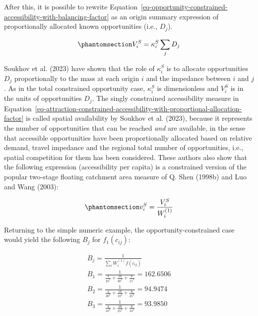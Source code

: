 \documentclass[
]{article}
\begin{document}
After this, it is possible to rewrite
Equation~\ref{eq-opportunity-constrained-accessibility-with-balancing-factor}
as an origin summary expression of proportionally allocated known
opportunities (i.e., \(D_j\)).

\begin{equation}\phantomsection\label{eq-attraction-constrained-accessibility-with-proportional-allocation-factor}{
V^S_{i} = \kappa^S_{i} \sum_j   D_j
}\end{equation}

Soukhov et al. (2023) have shown that the role of \(\kappa^S_{i}\) is to
allocate opportunities \(D_j\) proportionally to the mass at each origin
\(i\) and the impedance between \(i\) and \(j\). As in the total
constrained opportunity case, \(\kappa^S_{i}\) is dimensionless and
\(V_i^S\) is in the units of opportunities \(D_j\). The singly
constrained accessibility measure in
Equation~\ref{eq-attraction-constrained-accessibility-with-proportional-allocation-factor}
is called spatial availability by Soukhov et al. (2023), because it
represents the number of opportunities that can be reached \emph{and}
are available, in the sense that accessible opportunities have been
proportionally allocated based on relative demand, travel impedance and
the regional total number of opportunities, i.e., spatial competition
for them has been considered. These authors also show that the following
expression (accessibility per capita) is a constrained version of the
popular two-stage floating catchment area measure of Q. Shen (1998b) and
Luo and Wang (2003):

\begin{equation}\phantomsection\label{eq-opportunity-constrained-accessibility-per-capita}{
v^S_{i} = \frac{V^S_{i}}{W^{(1)}_i}
}\end{equation}

Returning to the simple numeric example, the opportunity-constrained
case would yield the following \(B_{j}\) for \(f_1(c_{ij})\):

\[
\begin{array}{l}
B_{j} = \frac{1}{\sum_i W_i^{(1)} f(c_{ij})}\\
B_{1} =  \frac{1}{\frac{4}{10^3} + \frac{10}{30^3} + \frac{6}{15^3}} = 162.6506\\ 
B_{2} =  \frac{1}{\frac{4}{30^3} + \frac{10}{10^3} + \frac{6}{25^3}} = 94.9474\\
B_{3} =  \frac{1}{\frac{4}{10^3} + \frac{10}{25^3} + \frac{6}{10^3}} = 93.9850
\end{array}
\]
\end{document}
